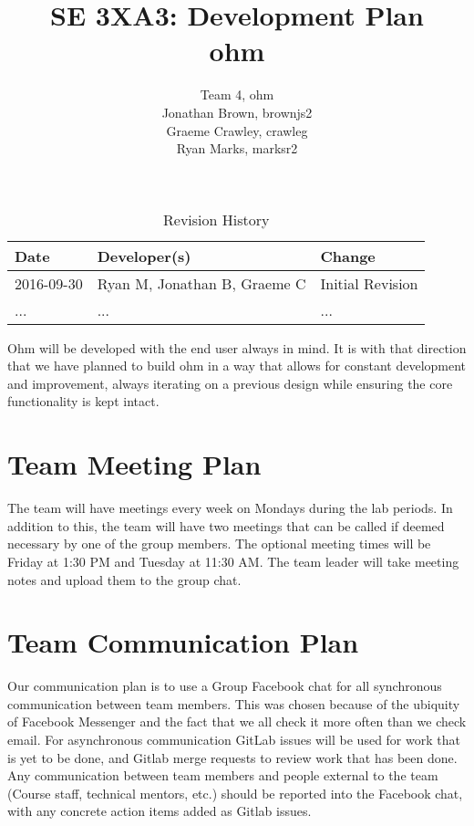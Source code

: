 \documentclass{article}
\title{SE 3XA3: Development Plan \\ohm}
\author{Team 4, ohm
		\\Jonathan Brown, brownjs2
		\\Graeme Crawley, crawleg
		\\Ryan Marks, marksr2
}
\date{}
\begin{document}
\begin{table}[hp]
\caption{Revision History} \label{TblRevisionHistory}
\begin{tabularx}{\textwidth}{llX}
\toprule
\textbf{Date} & \textbf{Developer(s)} & \textbf{Change}\\
\midrule
2016-09-30 & Ryan M, Jonathan B, Graeme C & Initial Revision\\
... & ... & ...\\
\bottomrule
\end{tabularx}
\end{table}

\newpage

\maketitle

Ohm will be developed with the end user always in mind. It is with that direction that we have planned to build ohm in a way that allows for constant development and improvement, always iterating on a previous design while ensuring the core functionality is kept intact.

\section{Team Meeting Plan}
The team will have meetings every week on Mondays  during the lab periods. In addition to this, the team will have two meetings that can be called if deemed necessary by one of the group members. The optional meeting times will be Friday at 1:30 PM and Tuesday at 11:30 AM. The team leader will take meeting notes and upload them to the group chat.


\section{Team Communication Plan}

Our communication plan is to use a Group Facebook chat for all synchronous communication between team members.
This was chosen because of the ubiquity of Facebook Messenger and the fact that we all check it more often than we check email.
For asynchronous communication GitLab issues will be used for work that is yet to be done, and Gitlab merge requests to review work that has been done.
Any communication between team members and people external to the team (Course staff, technical mentors, etc.) should be reported into the Facebook chat, 
with any concrete action items added as Gitlab issues.
\end{document}
